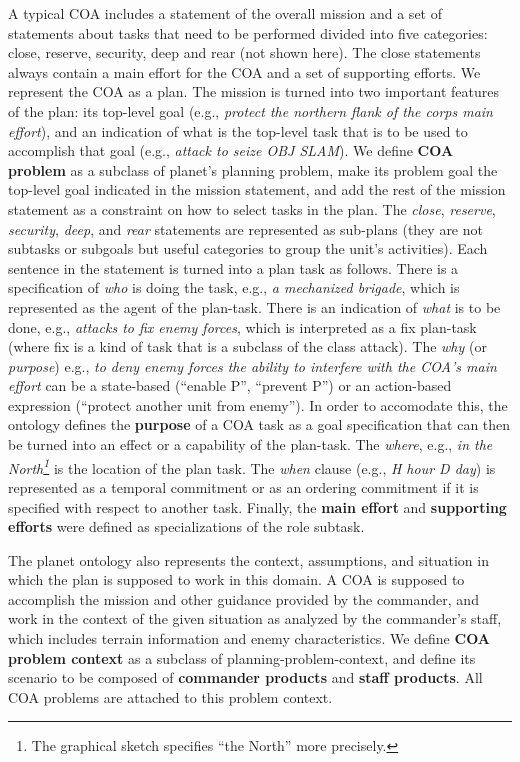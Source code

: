 A typical COA includes a statement of the overall mission and
a set of statements about tasks that need to be performed
divided into five categories: close, reserve, security, deep
and rear (not shown here).  The close statements always contain
a main effort for the COA and a set of supporting efforts.
We represent the COA as a plan.  The mission 
is turned into two important features of the plan:
its top-level goal 
(e.g., {\em protect the northern flank of the corps main effort}), 
and an indication of what is the 
top-level task that is to be used to accomplish that goal
(e.g., {\em attack to seize OBJ SLAM}).  
We define {\bf COA problem} as a subclass of 
{\sc planet}'s planning problem, make its 
problem goal the top-level goal indicated in the mission statement,
and add the rest of the mission statement as a constraint on how to
select tasks in the plan.
The {\em close}, {\em reserve}, {\em security}, {\em deep}, and {\em rear}
statements 
are represented as sub-plans (they are not subtasks or 
subgoals but useful categories to group the unit's activities).
Each sentence in the statement is turned into a plan task
as follows.
There is a specification of {\em who} is doing the task,
e.g., {\em a mechanized brigade}, which is represented as the 
agent of the plan-task.  
There is an indication of {\em what} is to be done,
e.g., {\em attacks to fix enemy forces},
which is interpreted as a fix plan-task 
(where fix is a kind of task that is a subclass of the class attack).
The {\em why} (or {\em purpose})
e.g., {\em to deny enemy forces the ability to interfere with the COA's main effort}
can be a state-based (``enable P'', ``prevent P'') 
or an action-based expression (``protect another unit from enemy'').
In order to accomodate this, the ontology defines the {\bf purpose}
of a COA task
as a goal specification that can then be turned into an 
effect or a capability of the plan-task.  
The {\em where}, e.g., {\em in the 
North\footnote{The graphical sketch specifies ``the North'' more
precisely.}}
is the location of the plan task. 
The {\em when} clause (e.g., {\em H hour D day}) 
is represented as a temporal commitment or as
an ordering commitment if it is specified with respect to another task.
Finally, the {\bf main effort} and {\bf supporting efforts} 
were defined as specializations of the role subtask.  

The {\sc planet} ontology also represents the 
context, assumptions, and situation in which the plan is supposed to work
in this domain.
A COA is supposed to accomplish the mission
and other guidance provided by the commander,
and work in the context of the given situation 
as analyzed by the commander's staff,
which includes terrain information and 
enemy characteristics.  
We define {\bf COA problem context} as a subclass of 
planning-problem-context, and define its scenario 
to be composed of
{\bf commander products} and {\bf staff products}.  
All COA problems are attached to this problem context.


